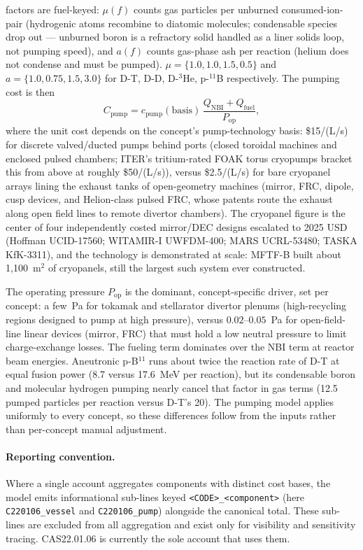 \documentclass{article}
\begin{document}
factors are fuel-keyed: $\mu(f)$ counts gas particles per unburned
consumed-ion-pair (hydrogenic atoms recombine to diatomic molecules;
condensable species drop out --- unburned boron is a refractory solid
handled as a liner solids loop, not pumping speed), and $a(f)$ counts
gas-phase ash per reaction (helium does not condense and must be
pumped). $\mu = \{1.0, 1.0, 1.5, 0.5\}$ and $a = \{1.0, 0.75, 1.5,
3.0\}$ for D-T, D-D, D-$^3$He, p-$^{11}$B respectively. The pumping
cost is then
\begin{equation}
\label{eq:cas2206-pump}
C_{\text{pump}} = c_{\text{pump}}(\text{basis})\,\frac{Q_{\text{NBI}} + Q_{\text{fuel}}}{P_{\text{op}}},
\end{equation}
where the unit cost depends on the concept's pump-technology basis:
\$15/(L/s) for discrete valved/ducted pumps behind ports (closed
toroidal machines and enclosed pulsed chambers; ITER's tritium-rated
FOAK torus cryopumps bracket this from above at roughly \$50/(L/s)),
versus \$2.5/(L/s) for bare cryopanel arrays lining the exhaust tanks of
open-geometry machines (mirror, FRC, dipole, cusp devices, and
Helion-class pulsed FRC, whose patents route the exhaust along open
field lines to remote divertor chambers). The cryopanel figure is the
center of four independently costed mirror/DEC designs escalated to
2025 USD (Hoffman UCID-17560; WITAMIR-I UWFDM-400; MARS UCRL-53480;
TASKA KfK-3311), and the technology is demonstrated at scale: MFTF-B
built about 1{,}100~m$^2$ of cryopanels, still the largest such system
ever constructed.

The operating pressure $P_{\text{op}}$ is the dominant, concept-specific
driver, set per concept: a few~Pa for tokamak and stellarator divertor
plenums (high-recycling regions designed to pump at high pressure),
versus $0.02$--$0.05$~Pa for open-field-line linear devices (mirror,
FRC) that must hold a low neutral pressure to limit charge-exchange
losses. The fueling term dominates over the NBI term at reactor beam
energies. Aneutronic p-B$^{11}$ runs about twice the reaction rate of
D-T at equal fusion power (8.7 versus 17.6~MeV per reaction), but its
condensable boron and molecular hydrogen pumping nearly cancel that
factor in gas terms (12.5 pumped particles per reaction versus D-T's
20). The pumping model applies uniformly to every concept, so these
differences follow from the inputs rather than per-concept manual
adjustment.

\paragraph{Reporting convention.} Where a single account aggregates
components with distinct cost bases, the model emits informational
sub-lines keyed \texttt{<CODE>\_<component>} (here
\texttt{C220106\_vessel} and \texttt{C220106\_pump}) alongside the
canonical total. These sub-lines are excluded from all aggregation and
exist only for visibility and sensitivity tracing. CAS22.01.06 is
currently the sole account that uses them.
\end{document}

